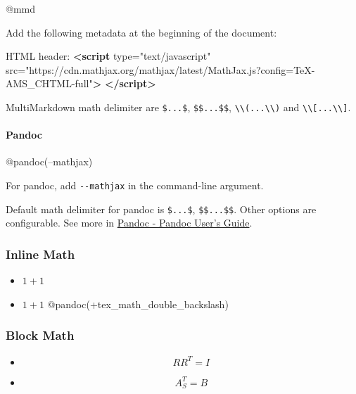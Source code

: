 \documentclass[]{article}
\newenvironment{Shaded}{}{}
\newcommand{\KeywordTok}[1]{\textcolor[rgb]{0.00,0.44,0.13}{\textbf{{#1}}}}
\newcommand{\StringTok}[1]{\textcolor[rgb]{0.25,0.44,0.63}{{#1}}}
\newcommand{\OtherTok}[1]{\textcolor[rgb]{0.00,0.44,0.13}{{#1}}}
\newcommand{\NormalTok}[1]{{#1}}
\providecommand{\tightlist}{%
  \setlength{\itemsep}{0pt}\setlength{\parskip}{0pt}}
\let\oldparagraph\paragraph
\renewcommand{\paragraph}[1]{\oldparagraph{#1}\mbox{}}
\begin{document}
@mmd

Add the following metadata at the beginning of the document:

\begin{Shaded}
\begin{Highlighting}[]
\NormalTok{HTML header:    }\KeywordTok{<script}\OtherTok{ type=}\StringTok{"text/javascript"}
\OtherTok{    src=}\StringTok{"https://cdn.mathjax.org/mathjax/latest/MathJax.js?config=TeX-AMS_CHTML-full"}\KeywordTok{>}
    \KeywordTok{</script>}
\end{Highlighting}
\end{Shaded}

MultiMarkdown math delimiter are \texttt{\$...\$}, \texttt{\$\$...\$\$},
\texttt{\textbackslash{}\textbackslash{}(...\textbackslash{}\textbackslash{})}
and
\texttt{\textbackslash{}\textbackslash{}{[}...\textbackslash{}\textbackslash{}{]}}.

\paragraph{Pandoc}\label{pandoc-2}

@pandoc(--mathjax)

For pandoc, add \texttt{-\/-mathjax} in the command-line argument.

Default math delimiter for pandoc is \texttt{\$...\$},
\texttt{\$\$...\$\$}. Other options are configurable. See more in
\href{http://pandoc.org/README.html\#non-pandoc-extensions}{Pandoc -
Pandoc User's Guide}.

\subsubsection{Inline Math}\label{inline-math}

\begin{itemize}
\tightlist
\item
  \(1+1\)
\item
  \(1 + 1\) @pandoc(+tex\_math\_double\_backslash)
\end{itemize}

\subsubsection{Block Math}\label{block-math}

\begin{itemize}
\tightlist
\item
  \[R R^T = I\]
\item
  \[A^T_S = B\]
\end{itemize}
\end{document}
